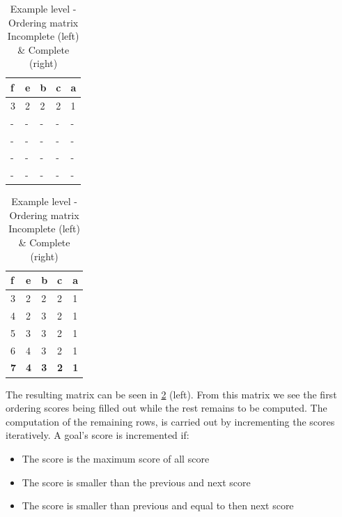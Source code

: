 \begin{table}[h!]
  \caption{\label{tab:example_matrix}\centering Example level - Ordering matrix \break Incomplete (left) \& Complete (right)}
	\begin{minipage}{.5\linewidth}
    \centering
    \begin{tabular}{@{}lllll@{}}
		\toprule
		\textbf{f} & \textbf{e} & \textbf{b} & \textbf{c} & \textbf{a} \\ \midrule
		3          & 2          & 2          & 2          & 1          \\ 
		-          & -          & -          & -          & -          \\ 
		-          & -          & -          & -          & -          \\ 
		-          & -          & -          & -          & -          \\ 
		-          & -          & -          & -          & -          \\ \bottomrule
		\end{tabular}
  \end{minipage}%
  \begin{minipage}{.5\linewidth}
    \centering
    \begin{tabular}{@{}lllll@{}}
		\toprule
		\textbf{f} & \textbf{e} & \textbf{b} & \textbf{c} & \textbf{a} \\ \midrule
		3          & 2          & 2          & 2          & 1          \\ 
		4          & 2          & 3          & 2          & 1          \\ 
		5          & 3          & 3          & 2          & 1          \\ 
		6          & 4          & 3          & 2          & 1          \\ \midrule
		\textbf{7} & \textbf{4} & \textbf{3} & \textbf{2} & \textbf{1} \\ \bottomrule
		\end{tabular}
  \end{minipage} 
\end{table}

The resulting matrix can be seen in \cref{tab:example_matrix} (left). 
From this matrix we see the first ordering scores being filled out while the rest remains to be computed. 
The computation of the remaining rows, is carried out by incrementing the scores iteratively. 
A goal's score is incremented if:

\begin{itemize} 
\item{The score is the maximum score of all score}
\item{The score is smaller than the previous and next score }
\item{The score is smaller than previous and equal to then next score}
\end{itemize} 

